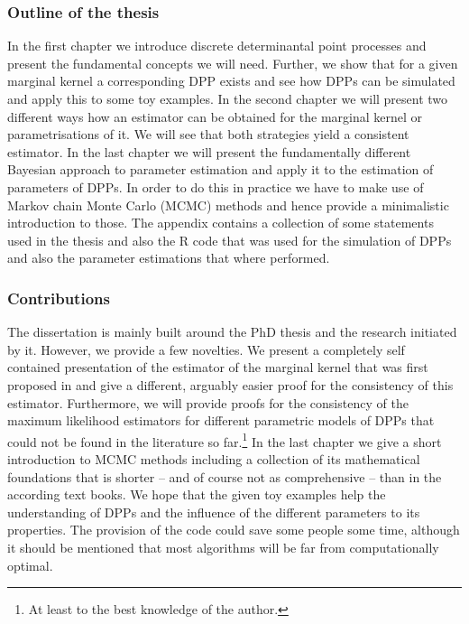 \subsubsection{Outline of the thesis}
In the first chapter we introduce discrete determinantal point processes and present the fundamental concepts we will need. Further, we show that for a given marginal kernel a corresponding DPP exists and see how DPPs can be simulated and apply this to some toy examples. In the second chapter we will present two different ways how an estimator can be obtained for the marginal kernel or parametrisations of it. We will see that both strategies yield a consistent estimator. In the last chapter we will present the fundamentally different Bayesian approach to parameter estimation and apply it to the estimation of parameters of DPPs. In order to do this in practice we have to make use of Markov chain Monte Carlo (MCMC) methods and hence provide a minimalistic introduction to those.
The appendix contains a collection of some statements used in the thesis and also the R code that was used for the simulation of DPPs and also the parameter estimations that where performed.

\subsubsection{Contributions}
The dissertation is mainly built around the PhD thesis \cite{kulesza2012learning} and the research initiated by it. However, we provide a few novelties. We present a completely self contained presentation of the estimator of the marginal kernel that was first proposed in \cite{urschel2017learning} and give a different, arguably easier proof for the consistency of this estimator. Furthermore, we will provide proofs for the consistency of the maximum likelihood estimators for different parametric models of DPPs that could not be found in the literature so far.\footnote{At least to the best knowledge of the author.} In the last chapter we give a short introduction to MCMC methods including a collection of its mathematical foundations that is shorter -- and of course not as comprehensive -- than in the according text books. We hope that the given toy examples help the understanding of DPPs and the influence of the different parameters to its properties. The provision of the code could save some people some time, although it should be mentioned that most algorithms will be far from computationally optimal.


